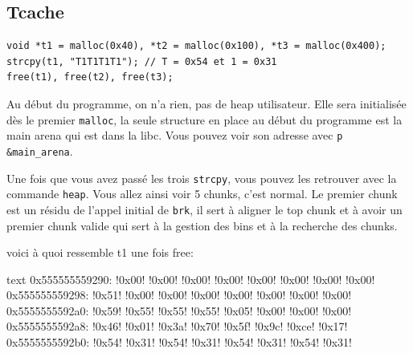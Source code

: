 \subsection{Tcache}
\begin{verbatim}
void *t1 = malloc(0x40), *t2 = malloc(0x100), *t3 = malloc(0x400);
strcpy(t1, "T1T1T1T1"); // T = 0x54 et 1 = 0x31
free(t1), free(t2), free(t3);
\end{verbatim}

Au début du programme, on n'a rien, pas de heap utilisateur.
Elle sera initialisée dès le premier \texttt{malloc}, la seule structure en place au début du programme est
la main arena qui est dans la libc. Vous pouvez voir son adresse avec \texttt{p \&main\_arena}.

Une fois que vous avez passé les trois \texttt{strcpy}, vous pouvez les retrouver avec la commande \texttt{heap}.
Vous allez ainsi voir 5 chunks, c'est normal.
Le premier chunk est un résidu de l'appel initial de \texttt{brk}, il sert à aligner le top chunk et à avoir
un premier chunk valide qui sert à la gestion des bins et à la recherche des chunks.

voici à quoi ressemble t1 une fois free:

\begin{pwndbg}[x/40bx t1 - 0x10]{text}
      0x555555559290: !\textcolor{pwndbgbrown}{0x00}! !\textcolor{pwndbgbrown}{0x00}! !\textcolor{pwndbgbrown}{0x00}! !\textcolor{pwndbgbrown}{0x00}! !\textcolor{pwndbgbrown}{0x00}! !\textcolor{pwndbgbrown}{0x00}! !\textcolor{pwndbgbrown}{0x00}! !\textcolor{pwndbgbrown}{0x00}!
      0x555555559298: !\textcolor{pwndbgred}{0x51}! !\textcolor{pwndbgred}{0x00}! !\textcolor{pwndbgred}{0x00}! !\textcolor{pwndbgred}{0x00}! !\textcolor{pwndbgred}{0x00}! !\textcolor{pwndbgred}{0x00}! !\textcolor{pwndbgred}{0x00}! !\textcolor{pwndbgred}{0x00}!
      0x5555555592a0: !\textcolor{pwndbgblue}{0x59}! !\textcolor{pwndbgblue}{0x55}! !\textcolor{pwndbgblue}{0x55}! !\textcolor{pwndbgblue}{0x55}! !\textcolor{pwndbgblue}{0x05}! !\textcolor{pwndbgblue}{0x00}! !\textcolor{pwndbgblue}{0x00}! !\textcolor{pwndbgblue}{0x00}!
      0x5555555592a8: !\textcolor{pwndbgdarkgreen}{0x46}! !\textcolor{pwndbgdarkgreen}{0x01}! !\textcolor{pwndbgdarkgreen}{0x3a}! !\textcolor{pwndbgdarkgreen}{0x70}! !\textcolor{pwndbgdarkgreen}{0x5f}! !\textcolor{pwndbgdarkgreen}{0x9c}! !\textcolor{pwndbgdarkgreen}{0xce}! !\textcolor{pwndbgdarkgreen}{0x17}!
      0x5555555592b0: !\textcolor{pwndbgdarkgreen}{0x54}! !\textcolor{pwndbgdarkgreen}{0x31}! !\textcolor{pwndbgdarkgreen}{0x54}! !\textcolor{pwndbgdarkgreen}{0x31}! !\textcolor{pwndbgdarkgreen}{0x54}! !\textcolor{pwndbgdarkgreen}{0x31}! !\textcolor{pwndbgdarkgreen}{0x54}! !\textcolor{pwndbgdarkgreen}{0x31}!
\end{pwndbg}

